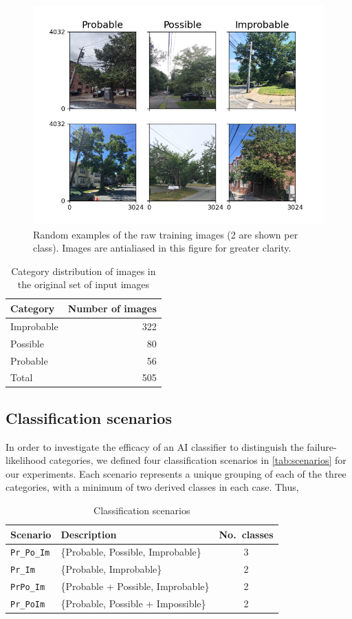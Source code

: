 \documentclass[Journal,letterpaper, SingleSpace, InsideFigs]{ascelike-new}
\begin{document}
\begin{figure}[h!]
  \centering
  \includegraphics[width=.7\textwidth]{raw_input_images_2}
  \caption{Random examples of the raw training images (2 are shown per class). Images are antialiased in this figure for greater clarity.}
  \label{fig:raw_images}
\end{figure}

\begin{table}[h!]\small
    \centering
    \begin{tabular}{l r}\toprule
    \bf Category     & \bf Number of images  \\ \midrule
    Improbable & 322\\
    Possible & 80 \\
    Probable & 56 \\\midrule
    Total & 505 \\\bottomrule
    \end{tabular}
    \caption{Category distribution of images in the original set of input images}
    \label{tab:classdist}
\end{table}


\subsection{Classification scenarios}
In order to investigate the efficacy of an AI classifier to distinguish the failure-likelihood categories, 
we defined four classification scenarios in \autoref{tab:scenarios} for our experiments. 
Each scenario represents a unique grouping of each of the three categories, with a minimum of two derived classes in each case.
Thus, 
\begin{table}[h!]
    \centering
    \begin{tabular}{l l c}\toprule
    \bf Scenario            & \bf Description  & \bf No.\ classes\\\midrule
    \texttt{Pr\_Po\_Im}     &  \{Probable, Possible, Improbable\} & 3 \\
    \texttt{Pr\_Im}          & \{Probable, Improbable\}           & 2 \\
    \texttt{PrPo\_Im}        & \{Probable + Possible, Improbable\}  & 2 \\
    \texttt{Pr\_PoIm}        & \{Probable, Possible + Impossible\}  & 2 \\\bottomrule
    \end{tabular}
    \caption{Classification scenarios}
    \label{tab:scenarios}
\end{table}
\end{document}

